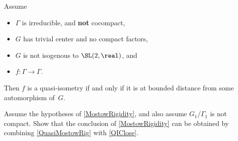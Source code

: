 \begin{thm} \label{QIClose}
 Assume
 \noprelistbreak
 \begin{itemize}
 \item $\Gamma$ is irreducible, and \textbf{not} cocompact,
 \item $G$ has trivial center and no compact factors,
 \item $G$ is not isogenous to $\SL(2,\real)$,
 and
 \item $f \colon \Gamma \to \Gamma$.
 \end{itemize}
 Then $f$ is a quasi-isometry if and only if it is at bounded distance from some automorphism of~$G$.
%
 \end{thm}


\begin{exercises}

\item \label{QI->Mostow}
Assume the hypotheses of  \cref{MostowRigidity}, and also assume $G_1/\Gamma_1$ is not compact. Show that the conclusion of \cref{MostowRigidity} can be obtained by combining \cref{QuasiMostowRig} with  \cref{QIClose}.


\end{exercises}




